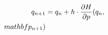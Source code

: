 \documentclass[preview]{standalone}
\begin{document}
\begin{align*}
\special{dvisvgm:raw <g id='unique000'>}q_{n+1} &= q_n + h \cdot \frac{\partial H}{\partial p}(q_n,\, \\mathbf{p_{n+1}})\special{dvisvgm:raw </g>}
\end{align*}
\end{document}
